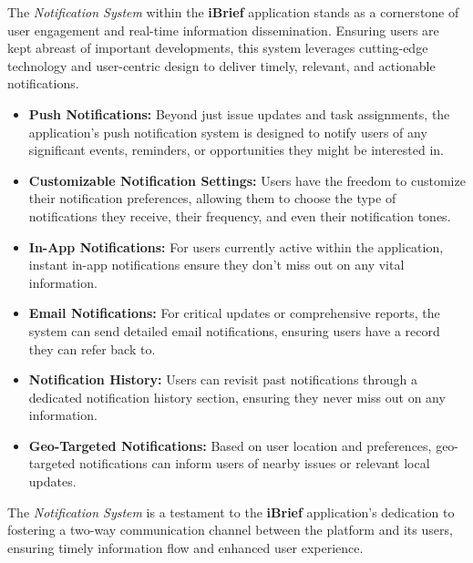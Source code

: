 The \textit{Notification System} within the \textbf{iBrief} application stands as a cornerstone of user engagement and real-time information dissemination. Ensuring users are kept abreast of important developments, this system leverages cutting-edge technology and user-centric design to deliver timely, relevant, and actionable notifications.

\begin{itemize}
    \item \textbf{Push Notifications:}
    Beyond just issue updates and task assignments, the application's push notification system is designed to notify users of any significant events, reminders, or opportunities they might be interested in.

    \item \textbf{Customizable Notification Settings:}
    Users have the freedom to customize their notification preferences, allowing them to choose the type of notifications they receive, their frequency, and even their notification tones.

    \item \textbf{In-App Notifications:}
    For users currently active within the application, instant in-app notifications ensure they don't miss out on any vital information.

    \item \textbf{Email Notifications:}
    For critical updates or comprehensive reports, the system can send detailed email notifications, ensuring users have a record they can refer back to.

    \item \textbf{Notification History:}
    Users can revisit past notifications through a dedicated notification history section, ensuring they never miss out on any information.

    \item \textbf{Geo-Targeted Notifications:}
    Based on user location and preferences, geo-targeted notifications can inform users of nearby issues or relevant local updates.
\end{itemize}

The \textit{Notification System} is a testament to the \textbf{iBrief} application's dedication to fostering a two-way communication channel between the platform and its users, ensuring timely information flow and enhanced user experience.
